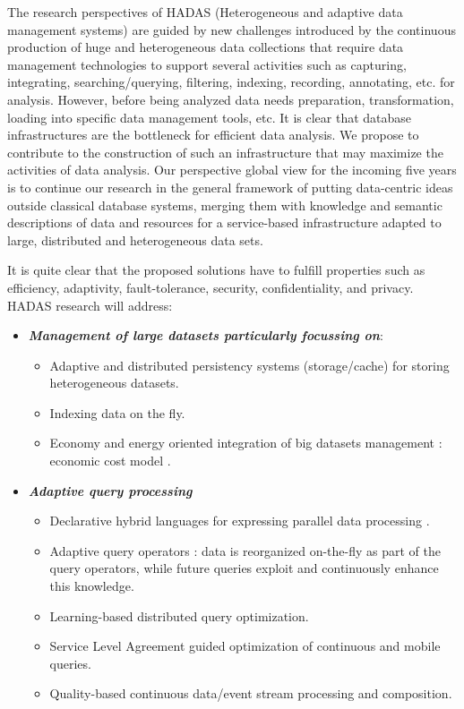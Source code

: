 The research perspectives of HADAS  (Heterogeneous and adaptive data management systems)  are guided by  new challenges introduced by the continuous production of huge and heterogeneous data collections that require data management technologies to support  several activities  such as capturing, integrating, searching/querying, filtering, indexing, recording, annotating, etc. for analysis. 
However, before being analyzed data needs preparation, transformation, loading into specific data management tools, etc. It is clear that database infrastructures are the bottleneck for efficient data analysis. We propose to contribute to the construction of such an infrastructure that may maximize the activities of data analysis. 
Our perspective global view for the incoming five years is to continue our research in the general framework of putting data-centric ideas outside classical database systems, merging them with knowledge and
semantic descriptions of data and resources for a service-based infrastructure adapted to large, distributed and heterogeneous data sets. 

It is quite clear that the proposed solutions have to fulfill  properties such as efficiency, adaptivity, fault-tolerance, security, confidentiality, and privacy. 
HADAS research will address:
\begin{itemize}
\item {\bf\em Management of large datasets particularly focussing on}:
\begin{itemize}
	\item Adaptive and distributed persistency systems (storage/cache) for storing heterogeneous datasets.
	\item Indexing data on the fly.
	\item Economy and energy oriented integration of big datasets management : economic cost model .
\end{itemize}
\item  {\bf\em Adaptive query processing}
\begin{itemize}
	\item Declarative hybrid languages for expressing parallel data processing .
	\item Adaptive query operators : data is reorganized on-the-fly as part of the query operators, while future queries exploit and continuously enhance this knowledge.
	\item Learning-based distributed query optimization.
	\item Service Level Agreement  guided optimization of continuous and mobile queries.
	\item Quality-based continuous data/event stream processing and composition.
\end{itemize}
\end{itemize}

